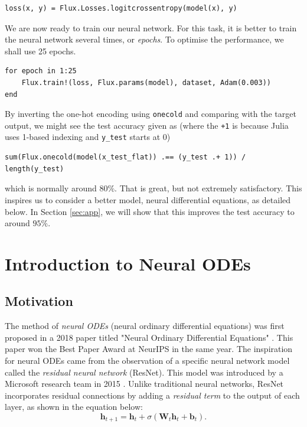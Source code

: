 \documentclass[a4paper,11pt,titlepage]{article}
\theoremstyle{definition}
\theoremstyle{plain}
\theoremstyle{remark}
\begin{document}
\begin{verbatim}
loss(x, y) = Flux.Losses.logitcrossentropy(model(x), y)
\end{verbatim}

We are now ready to train our neural network. For this task, it is better to train the neural network several times, or \textit{epochs}. To optimise the performance, we shall use 25 epochs.

\begin{verbatim}
for epoch in 1:25
    Flux.train!(loss, Flux.params(model), dataset, Adam(0.003))
end
\end{verbatim}

By inverting the one-hot encoding using \verb|onecold| and comparing with the target output, we might see the test accuracy given as (where the \verb|+1| is because Julia uses 1-based indexing and \verb|y_test| starts at 0)

\begin{verbatim}
sum(Flux.onecold(model(x_test_flat)) .== (y_test .+ 1)) / length(y_test)
\end{verbatim}

which is normally around $80\%$.  That is great, but not extremely satisfactory. This inspires us to consider a better model, neural differential equations, as detailed below. In Section \ref{sec:app}, we will show that this improves the test accuracy to around $95\%$.

\pagebreak
\section{Introduction to Neural ODEs}
\label{sec:intro}

\subsection{Motivation}

The method of \textit{neural ODEs} (neural ordinary differential equations) was first proposed in a 2018 paper titled "Neural Ordinary Differential Equations" \cite{chen2018neural}. This paper won the Best Paper Award at NeurIPS in the same year. The inspiration for neural ODEs came from the observation of a specific neural network model called the \textit{residual neural network} (ResNet). This model was introduced by a Microsoft research team in 2015 \cite{he2016deep}. Unlike traditional neural networks, ResNet incorporates residual connections by adding a \textit{residual term} to the output of each layer, as shown in the equation below:
\begin{equation}\label{eq1}
    \textbf{h}_{t+1} = \textbf{h}_t + \sigma\left(\textbf{W}_t\textbf{h}_t + \textbf{b}_t\right).\tag{1}
\end{equation}
\end{document}

